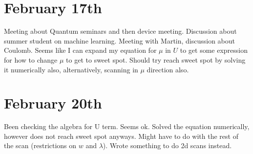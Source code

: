 \documentclass{article}
\begin{document}
\section*{February 17th}
Meeting about Quantum seminars and then device meeting. Discussion about summer student on machine learning. Meeting with Martin, discussion about Coulomb. Seems like I can expand my equation for $\mu$ in $U$ to get some expression for how to change $\mu$ to get to sweet spot. Should try reach sweet spot by solving it numerically also, alternatively, scanning in $\mu$ direction also.
\section*{February 20th}
Been checking the algebra for U term. Seems ok. Solved the equation numerically, however does not reach sweet spot anyways. Might have to do with the rest of the scan (restrictions on $w$ and $\lambda$). Wrote something to do 2d scans instead.
\end{document}
